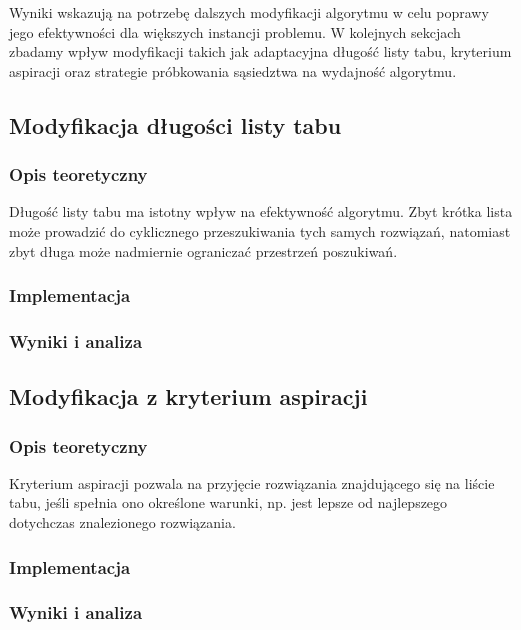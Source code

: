 \documentclass[12pt,a4paper]{article}
\begin{document}
Wyniki wskazują na potrzebę dalszych modyfikacji algorytmu w celu poprawy jego efektywności dla większych instancji problemu. W kolejnych sekcjach zbadamy wpływ modyfikacji takich jak adaptacyjna długość listy tabu, kryterium aspiracji oraz strategie próbkowania sąsiedztwa na wydajność algorytmu.

\subsection{Modyfikacja długości listy tabu}
\subsubsection{Opis teoretyczny}
Długość listy tabu ma istotny wpływ na efektywność algorytmu. Zbyt krótka lista może prowadzić do cyklicznego przeszukiwania tych samych rozwiązań, natomiast zbyt długa może nadmiernie ograniczać przestrzeń poszukiwań.

\subsubsection{Implementacja}

\subsubsection{Wyniki i analiza}

\subsection{Modyfikacja z kryterium aspiracji}
\subsubsection{Opis teoretyczny}
Kryterium aspiracji pozwala na przyjęcie rozwiązania znajdującego się na liście tabu, jeśli spełnia ono określone warunki, np. jest lepsze od najlepszego dotychczas znalezionego rozwiązania.

\subsubsection{Implementacja}

\subsubsection{Wyniki i analiza}
\end{document}

